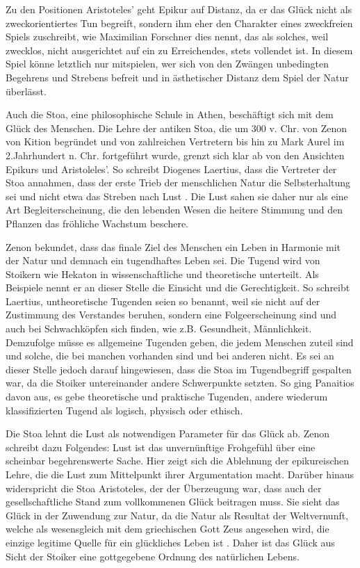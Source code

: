 Zu den Positionen Aristoteles' geht Epikur auf Distanz, da er das Glück nicht als zweckorientiertes Tun begreift, sondern ihm eher den Charakter eines \glqq zweckfreien Spiels\grqq{} zuschreibt, wie Maximilian Forschner dies nennt, \glqq das als solches, weil zwecklos, nicht ausgerichtet auf ein zu Erreichendes, stets vollendet ist.\grqq{} \cite[S.\,44]{MF93}
In diesem \glqq Spiel\grqq{} könne letztlich nur mitspielen, wer sich von den \glqq Zwängen unbedingten Begehrens und Strebens befreit und in ästhetischer Distanz dem Spiel der Natur überlässt.\grqq{} \cite[S.\,44]{MF93}
 
Auch die Stoa, eine philosophische Schule in Athen, beschäftigt sich mit dem Glück des Menschen. 
Die Lehre der antiken Stoa, die um 300 v. Chr. von Zenon von Kition begründet und von zahlreichen Vertretern bis hin zu Mark Aurel im 2.Jahrhundert n. Chr. fortgeführt wurde, grenzt sich klar ab von den Ansichten Epikurs und Aristoleles'. 
So schreibt Diogenes Laertius, dass die Vertreter der Stoa annahmen, dass der erste Trieb der menschlichen Natur die Selbsterhaltung sei und nicht etwa das Streben nach Lust \cite[S.\,48]{ZD67}.
Die Lust sahen sie daher nur als eine Art Begleiterscheinung, die \glqq den lebenden Wesen die heitere Stimmung und den Pflanzen das fröhliche Wachstum\grqq{} beschere. 

Zenon bekundet, dass das finale Ziel des Menschen ein Leben in Harmonie mit der Natur und demnach ein tugendhaftes Leben sei. 
Die Tugend wird von Stoikern wie Hekaton in wissenschaftliche und theoretische unterteilt. 
Als Beispiele nennt er an dieser Stelle die Einsicht und die Gerechtigkeit. 
So schreibt Laertius, untheoretische Tugenden seien so benannt, \glqq weil sie  nicht auf der Zustimmung des Verstandes beruhen, sondern eine Folgeerscheinung sind und auch bei Schwachköpfen sich finden, wie z.B. Gesundheit, Männlichkeit.\grqq{} \cite[S.\,50]{ZD67}
Demzufolge müsse es allgemeine Tugenden geben, die jedem Menschen zuteil sind und solche, die bei manchen vorhanden sind und bei anderen nicht. 
Es sei an dieser Stelle jedoch darauf hingewiesen, dass die Stoa im Tugendbegriff gespalten war, da die Stoiker untereinander andere Schwerpunkte setzten. 
So ging Panaitios davon aus, es gebe theoretische und praktische Tugenden, andere wiederum klassifizierten Tugend als logisch, physisch oder ethisch.

Die Stoa lehnt die Lust als notwendigen Parameter für das Glück ab. 
Zenon schreibt dazu Folgendes: \glqq Lust ist das unvernünftige Frohgefühl über eine scheinbar begehrenswerte Sache.\grqq{} \cite[S.\,60]{ZD67}
Hier zeigt sich die Ablehnung der epikureischen Lehre, die die Lust zum Mittelpunkt ihrer Argumentation macht. 
Darüber hinaus widerspricht die Stoa Aristoteles, der der Überzeugung war, dass auch der gesellschaftliche Stand zum vollkommenen Glück beitragen muss. 
Sie sieht das Glück in der Zuwendung zur Natur, da die Natur als Resultat der Weltvernunft, welche als wesensgleich mit dem griechischen Gott Zeus angesehen wird, die einzige legitime Quelle für ein glückliches Leben ist \cite[S.\,49]{ZD67}.
Daher ist das Glück aus Sicht der Stoiker eine gottgegebene Ordnung des natürlichen Lebens. 


